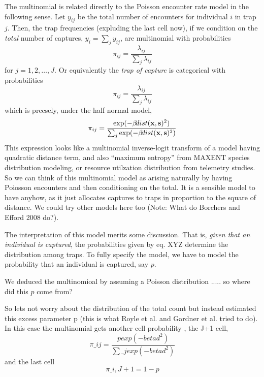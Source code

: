 {The multinomial is related directly to the Poisson encounter rate
model in the following sense. Let $y_{ij}$ be the total number of
encounters for individual $i$ in trap $j$. Then, the trap frequencies
(expluding the last cell now), if we condition on the {\it total}
number of captures, $y_{i} = \sum_{j} y_{ij}$, are multinomial with
probabilities
\[
 \pi_{ij} =  \frac{ \lambda_{ij} } { \sum_{j} \lambda_{ij} } 
\]
for $j=1,2,\ldots,J$.
Or equivalently the {\it trap of
  capture} is categorical with probabilities
\[
 \pi_{ij} =  \frac{ \lambda_{ij} } { \sum_{j} \lambda_{ij} } 
\]
which is precsely, under the half normal model, 
\[
 \pi_{ij} =  \frac{ \exp( - \beta \! dist({\bf x},{\bf s})^2 ) }  {
   \sum_{j} \exp(-\beta \! dist({\bf x},{\bf s})^2)}
\]
This expression looks like a multinomial inverse-logit transform of a model having
quadratic distance term, and also ``maximum entropy'' from MAXENT
species distribution modeling, or resource utilzation distribution
from telemetry studies.
So we can think of this multinomial model as arising naturally 
by having Poiosson encounters and then conditioning on the total. 
It is a sensible model to have anyhow, as it just allocates captures
to traps in proportion to the square of distance.  We could try other
models here too (Note: What do Borchers and Efford 2008 do?).


The interpretation of this model merits some discussion. That is, 
{\it given that an individual is captured}, the probabilities given by
eq. XYZ determine 
the distribution among traps. To fully specify the model, we have to
model the probability that an individual is captured, say $p$.

We deduced the multinomioal by assuming a Poisson distribution
..... so
where did this $p$ come from?

So lets not worry about the distribution of the total count
but instead estimated this excess parameter p (this is what Royle et al.
and Gardner et al. tried to do).  In this case the multinomial gets
another cell probability , the J+1 cell, 
\[
 \pi\_{ij} =  \frac{ p exp( - beta d^2 ) }  { \sum\_{j} exp(-beta d^2)}
\]
and the last cell
\[
 \pi\_{i,J+1} =  1-p 
\]

}
